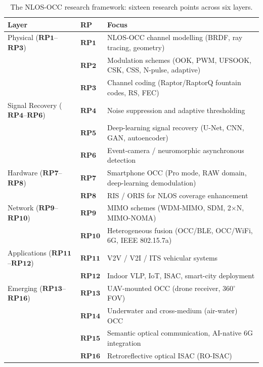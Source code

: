 \documentclass[10pt,a4paper]{article}
\newcommand{\rp}[1]{\textbf{RP#1}}
\begin{document}
\begin{table}[t]
\centering
\caption{The NLOS-OCC research framework: sixteen research points across six layers.}
\label{tab:rps}
\small
\begin{tabularx}{\textwidth}{l l X}
\toprule
\textbf{Layer} & \textbf{RP} & \textbf{Focus} \\
\midrule
Physical ($\rp{1}$--$\rp{3}$) & $\rp{1}$ & NLOS-OCC channel modelling (BRDF, ray tracing, geometry) \\
 & $\rp{2}$ & Modulation schemes (OOK, PWM, UFSOOK, CSK, CSS, N-pulse, adaptive) \\
 & $\rp{3}$ & Channel coding (Raptor/RaptorQ fountain codes, RS, FEC) \\
\midrule
Signal Recovery ($\rp{4}$--$\rp{6}$) & $\rp{4}$ & Noise suppression and adaptive thresholding \\
 & $\rp{5}$ & Deep-learning signal recovery (U-Net, CNN, GAN, autoencoder) \\
 & $\rp{6}$ & Event-camera / neuromorphic asynchronous detection \\
\midrule
Hardware ($\rp{7}$--$\rp{8}$) & $\rp{7}$ & Smartphone OCC (Pro mode, RAW domain, deep-learning demodulation) \\
 & $\rp{8}$ & RIS / ORIS for NLOS coverage enhancement \\
\midrule
Network ($\rp{9}$--$\rp{10}$) & $\rp{9}$ & MIMO schemes (WDM-MIMO, SDM, 2$\times$N, MIMO-NOMA) \\
 & $\rp{10}$ & Heterogeneous fusion (OCC/BLE, OCC/WiFi, 6G, IEEE 802.15.7a) \\
\midrule
Applications ($\rp{11}$--$\rp{12}$) & $\rp{11}$ & V2V / V2I / ITS vehicular systems \\
 & $\rp{12}$ & Indoor VLP, IoT, ISAC, smart-city deployment \\
\midrule
Emerging ($\rp{13}$--$\rp{16}$) & $\rp{13}$ & UAV-mounted OCC (drone receiver, 360$^\circ$ FOV) \\
 & $\rp{14}$ & Underwater and cross-medium (air-water) OCC \\
 & $\rp{15}$ & Semantic optical communication, AI-native 6G integration \\
 & $\rp{16}$ & Retroreflective optical ISAC (RO-ISAC) \\
\bottomrule
\end{tabularx}
\end{table}
\end{document}

